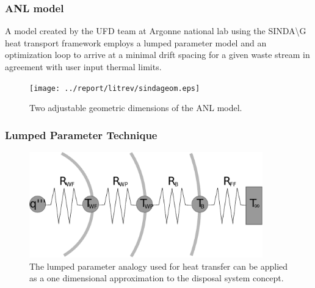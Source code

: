 
\begin{frame}
  \frametitle{ANL model}
  A model created by the UFD team at Argonne national lab using the 
  SINDA{\textbackslash}G heat transport framework employs a lumped parameter 
  model and an optimization loop to arrive at a minimal drift spacing for a 
  given waste stream in agreement with user input thermal limits. 
  \begin{figure}[h!]
    \begin{center}
      \texttt{[image: ../report/litrev/sindageom.eps]}
    \end{center}
    \caption{Two adjustable geometric dimensions of the ANL model.} 
    \label{fig:sindageom}
  \end{figure}
\end{frame}


\begin{frame}[ctb!]
  \frametitle{Lumped Parameter Technique}
  \begin{figure}[h!]
    \begin{center}
      \includegraphics[width=0.9\textwidth]{lumpedParam.eps}
    \end{center}
    \caption{The lumped parameter analogy used for heat transfer can be applied 
    as a one dimensional approximation to the disposal system concept. }
    \label{fig:lumpedParam}
  \end{figure}
\end{frame}



